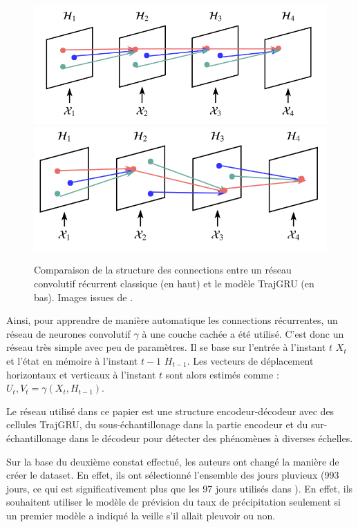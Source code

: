 \documentclass[12pt,a4paper,french]{article}
\begin{document}
\begin{figure}[H]
\centering
\includegraphics[scale=0.5]{images/liaison_tradi_CNN.png}
\includegraphics[scale=0.5]{images/liaison_traj_gru.png}
\caption{Comparaison de la structure des connections entre un réseau convolutif récurrent classique (en haut) et le modèle TrajGRU (en bas). Images issues de \cite{shi2017deep}.} 
\end{figure}

Ainsi, pour apprendre de manière automatique les connections récurrentes, un réseau de neurones convolutif $ \gamma $ à une couche cachée a été utilisé. C'est donc un réseau très simple avec peu de paramètres. Il se base sur l'entrée à l'instant $ t $ $ X_{t} $ et l'état en mémoire à l'instant $ t-1 $ $ H_{t-1} $. Les vecteurs de déplacement horizontaux et verticaux à l'instant $ t $ sont alors estimés comme : $ U_{t}, V_{t} = \gamma(X_{t}, H_{t-1}) $. \newline

Le réseau utilisé dans ce papier est une structure encodeur-décodeur avec des cellules TrajGRU, du sous-échantillonage dans la partie encodeur et du sur-échantillonage dans le décodeur pour détecter des phénomènes à diverses échelles. \newline

Sur la base du deuxième constat effectué, les auteurs ont changé la manière de créer le dataset. En effet, ils ont sélectionné l'ensemble des jours pluvieux (993 jours, ce qui est significativement plus que les 97 jours utilisés dans \cite{shi2015convolutional}). En effet, ils souhaitent utiliser le modèle de prévision du taux de précipitation seulement si un premier modèle a indiqué la veille s'il allait pleuvoir ou non. 
\end{document}
